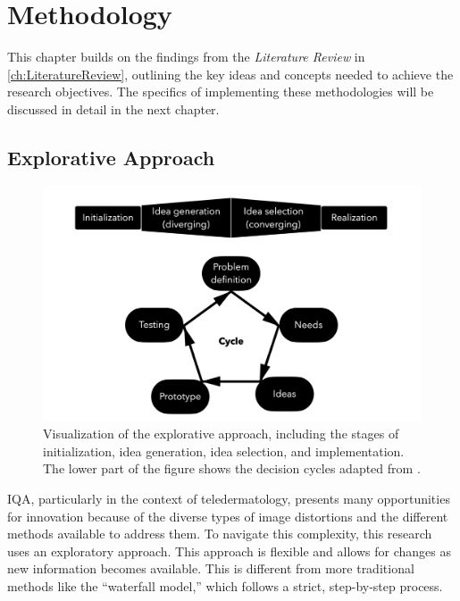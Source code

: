 \chapter{Methodology}
\label{ch:Methodology}
This chapter builds on the findings from the \textit{Literature Review} in \autoref{ch:LiteratureReview}, outlining the key ideas and concepts needed to achieve the research objectives. The specifics of implementing these methodologies will be discussed in detail in the next chapter. \par

\section{Explorative Approach}
\label{sec:ExplorativeApproach}
\begin{figure}[ht]
    \centering
    \includegraphics[keepaspectratio,width=13cm]{img/DecisionCycle.jpg}
    \caption{Visualization of the explorative approach, including the stages of initialization, idea generation, idea selection, and implementation. The lower part of the figure shows the decision cycles adapted from \autocite{DesignThinking}.}
    \label{fig:decision_cycle}
\end{figure}
\noindent
IQA, particularly in the context of teledermatology, presents many opportunities for innovation because of the diverse types of image distortions and the different methods available to address them. To navigate this complexity, this research uses an exploratory approach. This approach is flexible and allows for changes as new information becomes available. This is different from more traditional methods like the “waterfall model,” which follows a strict, step-by-step process.\par
\vspace{\baselineskip}
